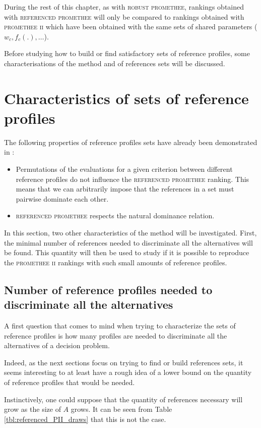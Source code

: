 During the rest of this chapter, as with \textsc{robust promethee}, rankings obtained with \textsc{referenced promethee} will only be compared to rankings obtained with \textsc{promethee ii} which have been obtained with the same sets of shared parameters ($w_c, f_c(.), \dots$).

Before studying how to build or find satisfactory sets of reference profiles, some characterisations of the method and of references sets will be discussed.

\section{Characteristics of sets of reference profiles}

The following properties of reference profiles sets have already been demonstrated in \cite{RefPII}:
\begin{itemize}
    \item Permutations of the evaluations for a given criterion between different reference profiles do not influence the \textsc{referenced promethee} ranking. This means that we can arbitrarily impose that the references in a set must pairwise dominate each other.
    \item \textsc{referenced promethee} respects the natural dominance relation.
\end{itemize}

In this section, two other characteristics of the method will be investigated.
First, the minimal number of references needed to discriminate all the alternatives will be found.
This quantity will then be used to study if it is possible to reproduce the \textsc{promethee ii} rankings with such small amounts of reference profiles.

\subsection{Number of reference profiles needed to discriminate all the alternatives}

A first question that comes to mind when trying to characterize the sets of reference profiles is how many profiles are needed to discriminate all the alternatives of a decision problem.

Indeed, as the next sections focus on trying to find or build references sets, it seems interesting to at least have a rough idea of a lower bound on the quantity of reference profiles that would be needed.

Instinctively, one could suppose that the quantity of references necessary will grow as the size of $A$ grows.
It can be seen from Table \ref{tbl:referenced_PII_draws} that this is not the case.


